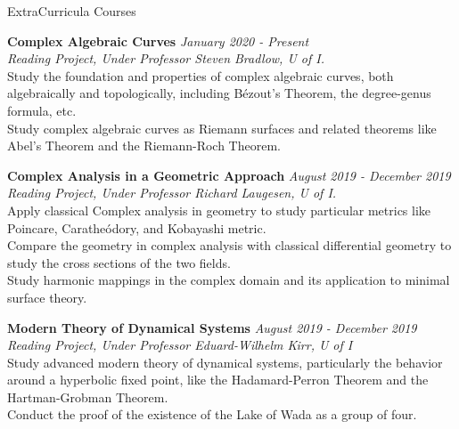 \documentclass{cv} %
\begin{document}
\begin{rSection}{ExtraCurricula Courses}

{\bf Complex Algebraic Curves} \hfill {\em January 2020 - Present}
\\ {\em Reading Project, Under Professor Steven Bradlow, U of I.}
\\ \textbullet{} Study the foundation and properties of complex algebraic curves, both algebraically and topologically, including B\'ezout's Theorem, the degree-genus formula, etc.
\\ \textbullet{} Study complex algebraic curves as Riemann surfaces and related theorems like Abel's Theorem and the Riemann-Roch Theorem.

{\bf Complex Analysis in a Geometric Approach} \hfill {\em August 2019 - December 2019}
\\ {\em Reading Project, Under Professor Richard Laugesen, U of I.}
\\ \textbullet{} Apply classical Complex analysis in geometry to study particular metrics like Poincare, Carathe\'{o}dory, and Kobayashi metric.
\\ \textbullet{} Compare the geometry in complex analysis with classical differential geometry to study the cross sections of the two fields.
\\ \textbullet{} Study harmonic mappings in the complex domain and its application to minimal surface theory.

{\bf Modern Theory of Dynamical Systems} \hfill {\em August 2019 - December 2019}
\\ {\em Reading Project, Under Professor Eduard-Wilhelm Kirr, U of I}
\\ \textbullet{} Study advanced modern theory of dynamical systems, particularly the behavior around a hyperbolic fixed point, like the Hadamard-Perron Theorem and the Hartman-Grobman Theorem.
\\ \textbullet{} Conduct the proof of the existence of the Lake of Wada as a group of four.

\end{rSection}

\end{document}
